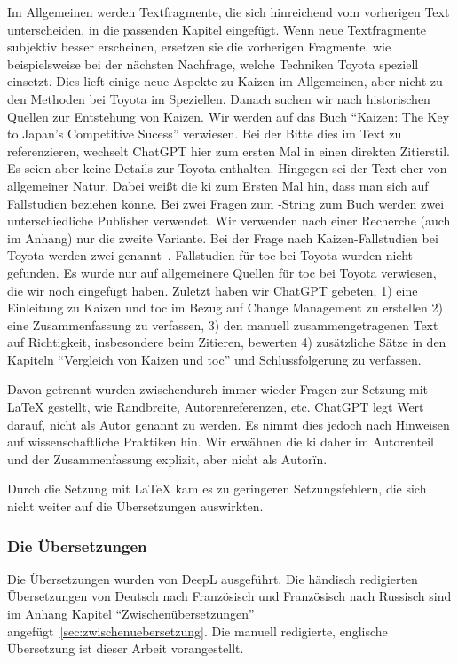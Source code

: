 Im Allgemeinen werden Textfragmente, die sich hinreichend vom vorherigen Text unterscheiden, in die passenden Kapitel eingefügt. Wenn neue Textfragmente subjektiv besser erscheinen, ersetzen sie die vorherigen Fragmente, wie beispielsweise bei der nächsten Nachfrage, welche Techniken Toyota speziell einsetzt. Dies lieft einige neue Aspekte zu Kaizen im Allgemeinen, aber nicht zu den Methoden bei Toyota im Speziellen.
Danach suchen wir nach historischen Quellen zur Entstehung von Kaizen. Wir werden auf das Buch "`Kaizen: The Key to Japan's Competitive Sucess"' \cite{imai1986kaizen} verwiesen. Bei der Bitte dies im Text zu referenzieren, wechselt ChatGPT hier zum ersten Mal in einen direkten Zitierstil. Es seien aber keine Details zur Toyota enthalten. Hingegen sei der Text eher von allgemeiner Natur. Dabei weißt die \gls{ki} zum Ersten Mal hin, dass man sich auf Fallstudien beziehen könne. Bei zwei Fragen zum \BibTeX{}-String zum Buch werden zwei unterschiedliche Publisher verwendet. Wir verwenden nach einer Recherche (auch im Anhang) nur die zweite Variante. Bei der Frage nach Kaizen-Fallstudien bei Toyota werden zwei genannt~\cite{ibscmr2003toyotakaizen, casecentre2002toyotakaizen}. Fallstudien für \gls{toc} bei Toyota wurden nicht gefunden. Es wurde nur auf allgemeinere Quellen für \gls{toc} bei Toyota verwiesen, die wir noch eingefügt haben.
Zuletzt haben wir ChatGPT gebeten, 1) eine Einleitung zu Kaizen und \gls{toc} im Bezug auf Change Management zu erstellen 2) eine Zusammenfassung zu verfassen, 3) den manuell zusammengetragenen Text auf Richtigkeit, insbesondere beim Zitieren,  bewerten 4) zusätzliche Sätze in den Kapiteln "`Vergleich von Kaizen und \gls{toc}"' und Schlussfolgerung zu verfassen.

Davon getrennt wurden zwischendurch immer wieder Fragen zur Setzung mit \LaTeX{} gestellt, wie Randbreite, Autorenreferenzen, etc. ChatGPT legt Wert darauf, nicht als Autor genannt zu werden. Es nimmt dies jedoch nach Hinweisen auf wissenschaftliche Praktiken hin. Wir erwähnen die \gls{ki} daher im Autorenteil und der Zusammenfassung explizit, aber nicht als Autorïn.

Durch die Setzung mit \LaTeX{} kam es zu geringeren Setzungsfehlern, die sich nicht weiter auf die Übersetzungen auswirkten.

\subsubsection{Die Übersetzungen}

Die Übersetzungen wurden von DeepL ausgeführt. Die händisch redigierten Übersetzungen von Deutsch nach Französisch und Französisch nach Russisch sind im Anhang Kapitel "`Zwischenübersetzungen"' angefügt~\ref{sec:zwischenuebersetzung}. Die manuell redigierte, englische Übersetzung ist dieser Arbeit vorangestellt. 

